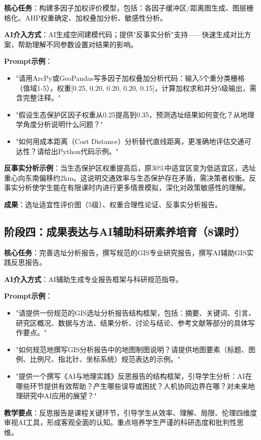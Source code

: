 \documentclass[12pt, a4paper]{article}
\begin{document}
\textbf{核心任务}：构建多因子加权评价模型，包括：各因子缓冲区/距离图生成、图层栅格化、AHP权重确定、加权叠加分析、敏感性分析。

\textbf{AI介入方式}：AI生成空间建模代码；提供"反事实分析"支持——快速生成对比方案，帮助理解不同参数设置对结果的影响。

\textbf{Prompt示例}：
\begin{itemize}
\item "请用ArcPy或GeoPandas写多因子加权叠加分析代码：输入5个重分类栅格（值域1-5），权重[0.25, 0.20, 0.20, 0.20, 0.15]，计算加权求和并分5级输出，需含完整注释。"
\item "假设生态保护区因子权重从0.25提高到0.35，预测选址结果如何变化？从地理学角度分析说明什么问题？"
\item "如何用成本距离（Cost Distance）分析替代直线距离，更准确地评估交通可达性？请给出Python代码示例。"
\end{itemize}

\textbf{反事实分析示例}：当生态保护区权重提高后，原30\%中适宜区变为低适宜区，选址重心向东南偏移约2km。这说明交通效率与生态保护存在矛盾，需决策者权衡。反事实分析使学生能在有限课时内进行更多情景模拟，深化对政策敏感性的理解。

\textbf{成果}：选址适宜性评价图（5级）、权重合理性论证、反事实分析报告。

\subsection{阶段四：成果表达与AI辅助科研素养培育（8课时）}

\textbf{核心任务}：完善选址分析报告，撰写规范的GIS专业研究报告，撰写AI辅助GIS实践反思报告。

\textbf{AI介入方式}：AI辅助生成专业报告框架与科研规范指导。

\textbf{Prompt示例}：
\begin{itemize}
\item "请提供一份规范的GIS选址分析报告结构框架，包括：摘要、关键词、引言、研究区概况、数据与方法、结果分析、讨论与结论、参考文献等部分的具体写作要点。"
\item "如何规范地撰写GIS分析报告中的地图制图说明？请提供地图要素（标题、图例、比例尺、指北针、坐标系统）规范表达的示例。"
\item "提供一个撰写《AI与地理实践》反思报告的结构框架，引导学生分析：AI在哪些环节提供有效帮助？产生哪些误导或困扰？人机协同边界在哪？对未来地理研究中AI应用的展望？"
\end{itemize}

\textbf{教学要点}：反思报告是课程关键环节，引导学生从效率、理解、局限、伦理四维度审视AI工具，形成客观全面的认知。重点培养学生严谨的科研态度和批判性思维。
\end{document}
